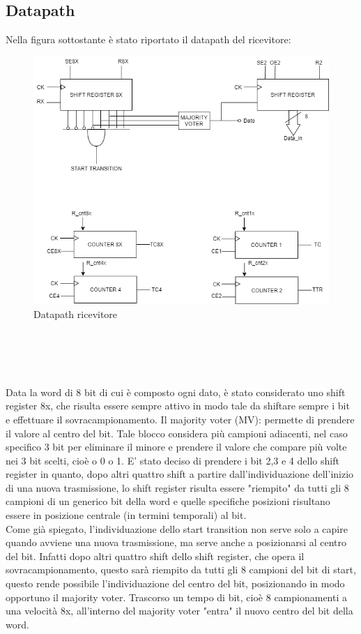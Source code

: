 \documentclass[a4paper, titlepage]{article}
\begin{document}
\subsection{Datapath} 
Nella figura sottostante è stato riportato il datapath del ricevitore:
\begin{figure}[h]
    \centering
    \includegraphics[scale=0.4]{DatapathRx (3).png}
    \caption{Datapath ricevitore}
    \label{fig:dp_rx}
\end{figure}
\\\\
\\\\ Data la word di 8 bit di cui è composto ogni dato, è stato considerato uno shift register 8x, che risulta essere sempre attivo in modo tale da shiftare sempre i bit e effettuare il sovracampionamento. Il majority voter (MV): permette di prendere il valore al centro del bit. Tale blocco considera più campioni adiacenti, nel caso specifico 3 bit per eliminare il minore e prendere il valore che compare più volte nei 3 bit scelti, cioè o 0 o 1. E' stato deciso di prendere i bit 2,3 e 4 dello shift register in quanto, dopo altri quattro shift a partire dall'individuazione dell'inizio di una nuova trasmissione, lo shift register risulta essere "riempito" da tutti gli 8 campioni di un generico bit della word e quelle specifiche posizioni risultano essere in posizione centrale (in termini temporali) al bit. %
\\
Come già spiegato, l'individuazione dello start transition non serve solo a capire quando avviene una nuova trasmissione, ma serve anche a posizionarsi al centro del bit. Infatti dopo altri quattro shift dello shift register, che opera il sovracampionamento, questo sarà riempito da tutti gli 8 campioni del bit di start, questo rende possibile l'individuazione del centro del bit, posizionando in modo opportuno il majority voter. Trascorso un tempo di bit, cioè 8 campionamenti a una velocità 8x, all'interno del majority voter "entra" il nuovo centro del bit della word.\\
\end{document}

